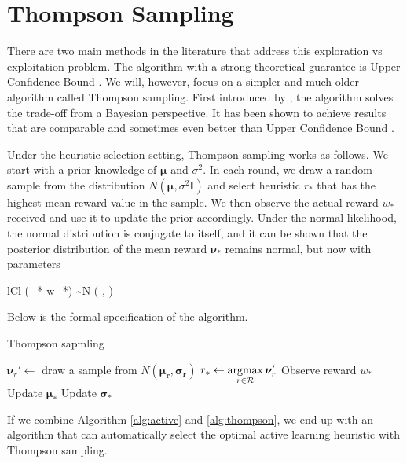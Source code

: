 \section{Thompson Sampling}
\label{sec:thompson}

There are two main methods in the literature that address this exploration vs exploitation 
problem. The algorithm with a strong theoretical guarantee is Upper Confidence Bound
\cite{auer02}. We will, however, focus on a simpler and much older algorithm called Thompson sampling.
First introduced by , the algorithm solves the trade-off from
a Bayesian perspective. It has been shown to achieve results
that are comparable and sometimes even better than Upper Confidence Bound \cite{chapelle11}.

Under the heuristic selection setting, Thompson sampling works as follows.
We start with a prior knowledge of $\bm{\mu}$ and $\sigma^2$. In each
round, we draw a random sample from the distribution $N(\bm{\mu}, \sigma^2 \bm{I})$
and select heuristic $r_*$ that has the highest mean reward value in the sample. We then 
observe the actual reward $w_{*}$ received and use it to update the prior accordingly.
Under the normal likelihood, the normal distribution is conjugate to itself, and it can be
shown that the posterior distribution of the mean reward $\bm{\nu}_{*}$
remains normal, but now with parameters
	\begin{IEEEeqnarray*}{lCl}
		(\bm{\nu}_{*} \mid w_{*}) \sim N \left(
		,
		\frac{\bm{\sigma}_* \bm{\tau}_*}{\bm{\tau}_* + \bm{\sigma}_*}
		\right)
	\end{IEEEeqnarray*}
Below is the formal specification of the algorithm.

\begin{algorithm}[h]
	\caption{Thompson sapmling}
	\label{alg:thompson}
	\begin{algorithmic}[1]
		\State $\bm{\nu}_r' \leftarrow$ draw a sample from $N(\bm{\mu_r}, \bm{\sigma_r})$
		\Endforeach
		\State $r_* \leftarrow \argmax_{r \in \R}\bm{\nu}_r'$
		\State Observe reward $w_{*}$
		\State Update $\bm{\mu}_{*}$
		\State Update $\bm{\sigma}_{*}$
		\Endforeach
		\EndProcedure
	\end{algorithmic}
\end{algorithm}

If we combine Algorithm \ref{alg:active} and \ref{alg:thompson}, we end up with
an algorithm that can automatically select the optimal active learning heuristic
with Thompson sampling.

